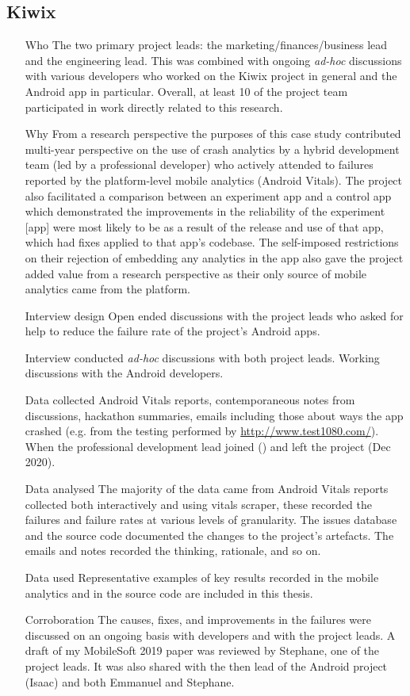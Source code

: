 \subsection{Kiwix}

\begin{itemize}
    \item[Who] The two primary project leads: the marketing/finances/business lead and the engineering lead. This was combined with ongoing \emph{ad-hoc} discussions with various developers who worked on the Kiwix project in general and the Android app in particular. Overall, at least 10 of the project team participated in work directly related to this research.
    \item[Why] From a research perspective the purposes of this case study contributed multi-year perspective on the use of crash analytics by a hybrid development team (led by a professional developer) who actively attended to failures reported by the platform-level mobile analytics (Android Vitals). The project also facilitated a comparison between an experiment app and a control app which demonstrated the improvements in the reliability of the experiment [app] were most likely to be as a result of the release and use of that app, which had fixes applied to that app's codebase. The self-imposed restrictions on their rejection of embedding any analytics in the app also gave the project added value from a research perspective as their only source of mobile analytics came from the platform. 
    \item[Interview design] Open ended discussions with the project leads who asked for help to reduce the failure rate of the project's Android apps.
    \item[Interview conducted] \emph{ad-hoc} discussions with both project leads. Working discussions with the Android developers.
    \item[Data collected] Android Vitals reports, contemporaneous notes from discussions, hackathon summaries, emails including those about ways the app crashed (e.g. from the testing performed by \url{http://www.test1080.com/}). When the professional development lead joined () and left the project (Dec 2020).
    \item[Data analysed] The majority of the data came from Android Vitals reports collected both interactively and using vitals scraper, these recorded the failures and failure rates at various levels of granularity. The issues database and the source code documented the changes to the project's artefacts. The emails and notes recorded the thinking, rationale, and so on.
    \item[Data used] Representative examples of key results recorded in the mobile analytics and in the source code are included in this thesis.
    \item[Corroboration] The causes, fixes, and improvements in the failures were discussed on an ongoing basis with developers and with the project leads. A draft of my MobileSoft 2019 paper was reviewed by Stephane, one of the project leads. It was also shared with the then lead of the Android project (Isaac) and both Emmanuel and Stephane. 
\end{itemize}

